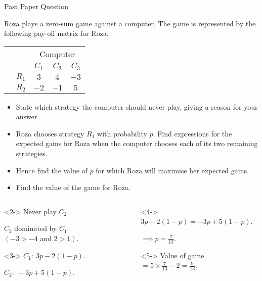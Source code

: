 \documentclass[8pt]{beamer}
\begin{document}
\begin{frame}[shrink=10]{Past Paper Question}
	\begin{problem}
	Roza plays a zero-sum game against a computer. The game is represented by the following pay-off matrix for Roza.
			\begin{center}
			\colorbox{cc}{
  \setlength\arrayrulewidth{0.5mm}
	\begin{tabular}{cc|ccc}
\multicolumn{2}{c}{} & \multicolumn{3}{c}{Computer}\\
\multicolumn{1}{c}{} &  & $C_1$  & $C_2$ & $ C_3$ \\ \hline 
\raisebox{0cm}{\multirow{2}*{\rotatebox{90}{Roza}}}  & $R_1$ & $3$ & $4$ & $-3$ \\
						     & $R_2$ & $-2$ & $-1$ & $5$ \\
\end{tabular}}
\end{center}

\begin{itemize}
	\item State which strategy the computer should never play, giving a reason for your answer.
	\item Roza chooses strategy $R_1$ with probability $p$. Find expressions for the expected gains for Roza when the computer chooses each of its two remaining strategies.
	\item Hence find the value of $p$ for which Roza will maximise her expected gains.
	\item Find the value of the game for Roza.
\end{itemize}
\end{problem}
\begin{columns}
\begin{column}{.5\linewidth}

\begin{solution}<2->
	Never play $ C_2$.

	$C_2$ dominated by $ C_1$ $(-3>-4 \text{ and } 2>1)$.
\end{solution}
\begin{solution}<3->
	$ C_1:\ 3p-2(1-p)$.

	$C_2:\ -3p+5(1-p)$.
\end{solution}
\end{column}
\begin{column}{.5\linewidth}
\begin{solution}<4->
	$3p-2(1-p)=-3p+5(1-p)$.

	 $\implies p=\frac{7}{13}$.
\end{solution}
\begin{solution}<5->
	Value of game $=5\times \frac{7}{13}-2=\frac{9}{13}$.
\end{solution}
\end{column}
\end{columns}
\end{frame}
\end{document}
